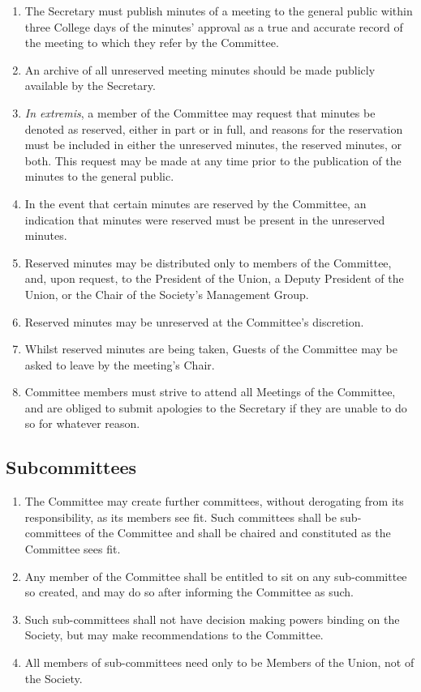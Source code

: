 \documentclass[a4paper]{tufte-handout}
\begin{document}
\begin{enumerate}[resume]
    \item The Secretary must publish minutes of a meeting to the general public within three College days of the minutes' approval as a true and accurate record of the meeting to which they refer by the Committee.
    \item An archive of all unreserved meeting minutes should be made publicly available by the Secretary.
    \item \textit{In extremis}, a member of the Committee may request that minutes be denoted as reserved, either in part or in full, and reasons for the reservation must be included in either the unreserved minutes, the reserved minutes, or both. This request may be made at any time prior to the publication of the minutes to the general public.
    \item In the event that certain minutes are reserved by the Committee, an indication that minutes were reserved must be present in the unreserved minutes.
    \item Reserved minutes may be distributed only to members of the Committee, and, upon request, to the President of the Union, a Deputy President of the Union, or the Chair of the Society's Management Group.
    \item Reserved minutes may be unreserved at the Committee's discretion.
    \item Whilst reserved minutes are being taken, Guests of the Committee may be asked to leave by the meeting's Chair.
    \item Committee members must strive to attend all Meetings of the Committee, and are obliged to submit apologies to the Secretary if they are unable to do so for whatever reason.
\end{enumerate}

\subsection{Subcommittees}
\begin{enumerate}[resume]
    \item The Committee may create further committees, without derogating from its responsibility, as its members see fit. Such committees shall be sub-committees of the Committee and shall be chaired and constituted as the Committee sees fit.
    \item Any member of the Committee shall be entitled to sit on any sub-committee so created, and may do so after informing the Committee as such.
    \item Such sub-committees shall not have decision making powers binding on the Society, but may make recommendations to the Committee.
    \item All members of sub-committees need only to be Members of the Union, not of the Society.
\end{enumerate}
\end{document}
